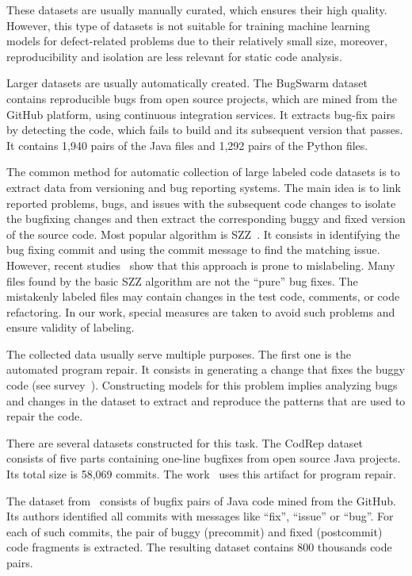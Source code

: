 \documentclass[10pt,conference]{IEEEtran}
\begin{document}
These datasets are usually manually curated, which ensures their high quality. 
However, this type of datasets is not suitable for training machine learning models for defect-related problems 
due to their relatively small size, moreover, reproducibility and isolation are less relevant for static code analysis. 

Larger datasets are usually automatically created. The BugSwarm dataset~\cite{Tomassi2019bugswarm} contains reproducible bugs from open source projects, which are mined from the GitHub platform, using continuous integration services. 
It extracts bug-fix pairs by detecting the code, which fails to build and its subsequent version that passes. 
It contains 1,940 pairs of the Java files and 1,292 pairs of the Python files. 

The common method for automatic collection of large labeled code datasets is to extract data from versioning and bug reporting systems. The main idea is to link reported problems, bugs, and issues with the subsequent code changes to isolate the bugfixing changes and then extract the corresponding buggy and fixed version of the source code.
Most popular algorithm is SZZ~\cite{SZZ2005,Zimmerman2005,Zimmerman2007}. It consists in identifying the bug fixing commit and using the commit message to find the matching issue. However, recent studies~\cite{Mills2018,Herbold2020} show that this approach is prone to mislabeling. Many files found by the basic SZZ algorithm are not the ``pure'' bug fixes. The mistakenly labeled files may contain  changes in the test code, comments, or code refactoring. In our work, special measures are taken to avoid such problems and ensure validity of labeling.

The collected data usually serve multiple purposes.
The first one is the automated program repair. It consists in generating a change that fixes the buggy code (see  survey~\cite{Monperrus2018repair}).
Constructing models for this problem implies analyzing bugs and changes in the dataset to extract and reproduce the patterns that are used to repair the code.

There are several datasets constructed for this task. 
The CodRep dataset~\cite{Chen2018codrep} consists of five parts containing one-line bugfixes from open source Java projects. Its total size is 58,069 commits. 
The work~\cite{Chen2019sequencer} uses this artifact for program repair.

The dataset from~\cite{TufanoEtAl2018} consists of bugfix pairs of Java code mined from the GitHub. 
Its authors identified all commits with messages like ``fix'', ``issue'' or ``bug''. 
For each of such commits, the pair of buggy (precommit) and fixed (postcommit) code fragments is extracted. The resulting dataset contains 800 thousands code pairs.
\end{document}
